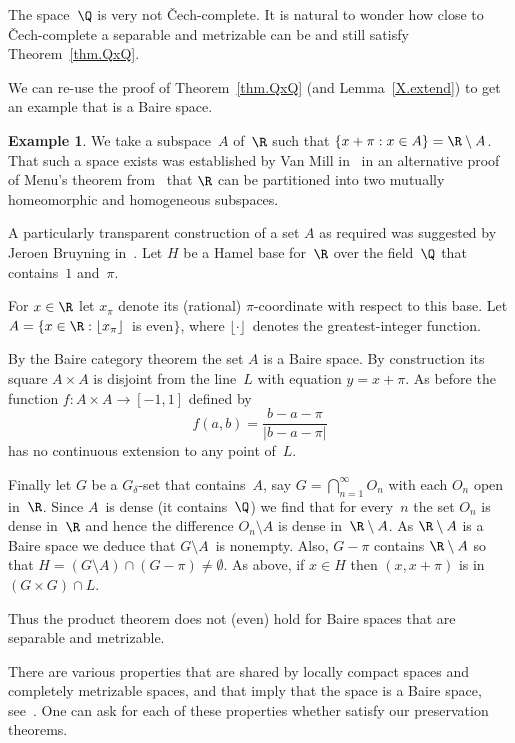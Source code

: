 \documentclass[a4paper]{amsart}
\theoremstyle{plain}
\theoremstyle{definition}
\newtheorem{example}[theorem]{Example}
\theoremstyle{remark}
\begin{document}
The space~$\Q$ is very not \v{C}ech-complete.
It is natural to wonder how close to \v{C}ech-complete a separable and 
metrizable can be and still satisfy Theorem~\ref{thm.QxQ}.

We can re-use the proof of Theorem~\ref{thm.QxQ} (and Lemma~\ref{X.extend})
to get an example that is a Baire space.

\begin{example}
We take a subspace~$A$ of~$\R$ such that $\{x+\pi:x\in A\}=\R\setminus A$.
That such a space exists was established by Van Mill in~\cite{MR0660152}
in an alternative proof of Menu's theorem from~\cite{Menu} that $\R$ can 
be partitioned into two mutually homeomorphic and homogeneous subspaces. 

\smallbreak
A particularly transparent construction of a set $A$ as required was 
suggested by Jeroen Bruyning in~\cite{MR0660152}. 
Let $H$ be a Hamel base for~$\R$ over the field~$\Q$ that 
contains~$1$ and~$\pi$.

For $x\in\R$ let $x_\pi$ denote its (rational) $\pi$-coordinate with respect
to this base. 
Let $A=\{x\in\R:\lfloor x_\pi\rfloor$~is even$\}$, where 
$\lfloor\cdot\rfloor$~denotes the greatest-integer function.

\smallbreak
By the Baire category theorem the set $A$ is a Baire space.
By construction its square $A\times A$ is disjoint from the line~$L$
with equation $y=x+\pi$.
As before the function $f:A\times A\to[-1,1]$ defined by
$$
f(a,b)=\frac{b-a-\pi}{|b-a-\pi|}  
$$
has no continuous extension to any point of~$L$.

Finally let $G$ be a $G_\delta$-set that contains~$A$, 
say $G=\bigcap_{n=1}^\infty O_n$ with each $O_n$ open in~$\R$.
Since $A$~is dense (it contains~$\Q$) we find that for every~$n$ the
set $O_n$ is dense in~$\R$ and hence the difference $O_n\setminus A$ is 
dense in~$\R\setminus A$.
As $\R\setminus A$ is a Baire space we deduce that $G\setminus A$~is nonempty.
Also, $G-\pi$ contains $\R\setminus A$ so that 
$H=(G\setminus A)\cap(G-\pi)\neq\emptyset$.
As above, if $x\in H$ then $(x,x+\pi)$ is in $(G\times G)\cap L$.
\end{example}

Thus the product theorem does not (even) hold for Baire spaces that are 
separable and metrizable.

\smallbreak
There are various properties that are shared by locally compact spaces
and completely metrizable spaces, and that imply that the space is a Baire
space, see~\cite{MR0380745}.
One can ask for each of these properties whether satisfy our preservation 
theorems.
\end{document}
